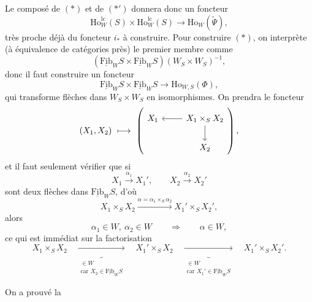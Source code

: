 \documentclass[11pt]{article}
\newcommand{\printedpage}[1]{\marginpar{\footnotesize p.~#1}}
\newcommand{\msp}[1]{\marginpar{\footnotesize [#1]}}
\newcommand{\Fibu}{\underline{\mathrm{Fib}}}
\newcommand{\Ho}{\mathrm{Ho}}
\newcommand{\lc}{\mathrm{lc}}
\begin{document}
\msp{page 245}
Le composé de $(*)$ et de $(*')$ donnera donc un foncteur
\[
\Ho^{\lc}_W(S) \times \Ho^{\lc}_W(S) \longrightarrow \Ho_W(\tilde{\Psi}), \tag*{$(**)$}
\]
très proche déjà du foncteur $i_*$ à construire. Pour construire $(*)$, on interprète (à équivalence de catégories près) le premier membre comme
\[
(\Fibu_W S \times \Fibu_W S)(W_S \times W_S)^{-1},
\]
donc il faut construire un foncteur
\[
\Fibu_W S \times \Fibu_W S \longrightarrow \Ho_{W,S}(\Phi),
\]
qui transforme flèches dans $W_S \times W_S$ en isomorphismes. On prendra le foncteur
\[
(X_1, X_2) \ \longmapsto \
\left(
\begin{tikzcd}
X_1 & X_1 \times_S X_2 \arrow[l] \arrow[d] \\
 & X_2
\end{tikzcd}
\right),
\]
\printedpage{159}
et il faut seulement vérifier que si
\[
X_1 \xrightarrow{\alpha_1} X_1', \qquad X_2 \xrightarrow{\alpha_2} X_2'
\]
sont deux flèches dans $\Fibu_W S$, d'où
\[
X_1 \times_S X_2 \xrightarrow{\alpha = \alpha_1 \times_S \alpha_2} X_1' \times_S X_2',
\]
alors
\[
\alpha_1 \in W,\ \alpha_2 \in W \qquad \Longrightarrow \qquad \alpha \in W,
\]
ce qui est immédiat sur la factorisation
\[
X_1 \times_S X_2 \quad \underbrace{\longrightarrow}_{\substack{\in W \\ \text{car } X_2 \in \Fibu_W S}} \quad X_1' \times_S X_2 \quad \underbrace{\longrightarrow}_{\substack{\in W \\ \text{car } X_1' \in \Fibu_W S}} \quad X_1' \times_S X_2'.
\]

\msp{page 246}
On a prouvé la
\end{document}
